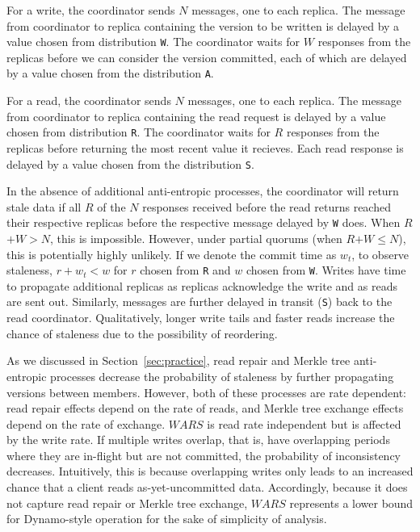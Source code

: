 \documentclass{vldb}
\begin{document}
For a write, the coordinator sends $N$ messages, one to each
replica. The message from coordinator to replica containing the
version to be written is delayed by a value chosen from distribution
\texttt{W}.  The coordinator waits for $W$ responses from the replicas
before we can consider the version committed, each of which are delayed by
a value chosen from the distribution \texttt{A}.

For a read, the coordinator sends $N$ messages, one to each replica.
The message from coordinator to replica containing the read request is
delayed by a value chosen from distribution \texttt{R}.  The
coordinator waits for $R$ responses from the replicas before returning
the most recent value it recieves.  Each read response is delayed by a value chosen
from the distribution \texttt{S}.

In the absence of additional anti-entropic processes, the coordinator
will return stale data if all $R$ of the $N$ responses received before
the read returns reached their respective replicas before the
respective message delayed by \texttt{W} does.  When $R$$+$$W$$>$$N$,
this is impossible.  However, under partial quorums (when
$R$$+$$W$$\leq$$N$), this is potentially highly unlikely.  If we
denote the commit time as $w_t$, to observe staleness, $r+w_t < w$ for
$r$ chosen from \texttt{R} and $w$ chosen from \texttt{W}.  Writes
have time to propagate additional replicas as replicas acknowledge the
write and as reads are sent out.  Similarly, messages are further
delayed in transit (\texttt{S}) back to the read coordinator.
Qualitatively, longer write tails and faster reads increase the chance
of staleness due to the possibility of reordering.

As we discussed in Section~\ref{sec:practice}, read repair and Merkle
tree anti-entropic processes decrease the probability of staleness by
further propagating versions between members.  However, both of these
processes are rate dependent: read repair effects depend on the rate
of reads, and Merkle tree exchange effects depend on the rate of
exchange.  $WARS$ is read rate independent but is affected by the
write rate.  If multiple writes overlap, that is, have overlapping
periods where they are in-flight but are not committed, the
probability of inconsistency decreases.  Intuitively, this is because
overlapping writes only leads to an increased chance that a client
reads as-yet-uncommitted data.  Accordingly, because it does not
capture read repair or Merkle tree exchange, $WARS$ represents a lower
bound for Dynamo-style operation for the sake of simplicity of
analysis.
\end{document}
